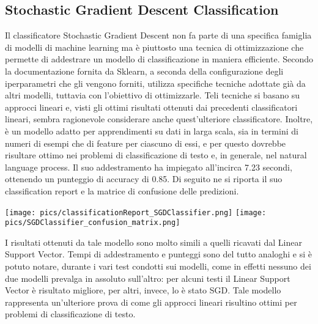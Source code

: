 \documentclass[12pt,oneside]{article}
\begin{document}
   \begin{enumerate}
    \subsection{Stochastic Gradient Descent Classification}
    \begin{justify}
    Il classificatore Stochastic Gradient Descent non fa parte di una specifica famiglia di modelli di machine learning ma è piuttosto una tecnica di ottimizzazione che permette di addestrare un modello di classificazione in maniera efficiente. Secondo la documentazione fornita da Sklearn, a seconda della configurazione degli iperparametri che gli vengono forniti, utilizza specifiche tecniche adottate già da altri modelli, tuttavia con l’obiettivo di ottimizzarle. Teli tecniche si basano su approcci lineari e, visti gli ottimi risultati ottenuti dai precedenti classificatori lineari, sembra ragionevole considerare anche quest’ulteriore classificatore. Inoltre, è un modello adatto per apprendimenti su dati in larga scala, sia in termini di numeri di esempi che di feature per ciascuno di essi, e per questo dovrebbe risultare ottimo nei problemi di classificazione di testo e, in generale, nel natural language process.
    Il suo addestramento ha impiegato all’incirca 7.23 secondi, ottenendo un punteggio di accuracy di 0.85. Di seguito ne si riporta il suo classification report e la matrice di confusione delle predizioni.
    \end{justify}

    \texttt{[image: pics/classificationReport\_SGDClassifier.png]}
    \texttt{[image: pics/SGDClassifier\_confusion\_matrix.png]}

    \begin{justify}
    I risultati ottenuti da tale modello sono molto simili a quelli ricavati dal Linear Support Vector. Tempi di addestramento e punteggi sono del tutto analoghi e si è potuto notare, durante i vari test condotti sui modelli, come in effetti nessuno dei due modelli prevalga in assoluto sull’altro: per alcuni testi il Linear Support Vector è risultato migliore, per altri, invece, lo è stato SGD. Tale modello rappresenta un’ulteriore prova di come gli approcci lineari risultino ottimi per problemi di classificazione di testo.
    \end{justify}
    \end{enumerate}
    
\end{document}
